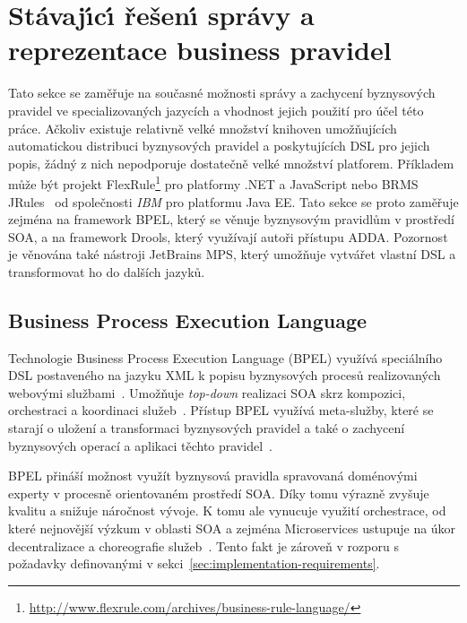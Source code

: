 \section{Stávaj\'{\i}c\'{\i} řešen\'{\i} správy a reprezentace business pravidel}\label{sec:business-rule-dsl}

Tato sekce se zaměřuje na současné možnosti správy a zachycení byznysových pravidel
ve specializovaných jazycích a vhodnost jejich použití pro účel této práce.
Ačkoliv existuje relativně velké množství knihoven umožňujících automatickou distribuci
byznysových pravidel a poskytujících \gls{DSL} pro jejich popis, žádný z nich nepodporuje dostatečně velké množství platforem.
Příkladem může být projekt FlexRule\footnote{\url{http://www.flexrule.com/archives/business-rule-language/}} pro platformy .NET a
JavaScript nebo \gls{BRMS} JRules~\cite{boyer2011ibm} od společnosti \textit{IBM} pro platformu \gls{Java EE}.
Tato sekce se proto zaměřuje zejména na framework \gls{BPEL}, který se věnuje byznysovým pravidlům v prostředí \gls{SOA}, a na
framework Drools, který využívají autoři přístupu \gls{ADDA}. Pozornost je věnována také nástroji JetBrains MPS,
který umožňuje vytvářet vlastní \gls{DSL} a transformovat ho do dalších jazyků.

\subsection{Business Process Execution Language}

Technologie Business Process Execution Language (\gls{BPEL}) využívá speciálního \gls{DSL}
postaveného na jazyku \gls{XML} k popisu byznysových procesů realizovaných webovými
službami~\cite{andrews2003business}. Umožňuje \textit{top-down} realizaci \gls{SOA}
skrz kompozici, orchestraci a koordinaci služeb~\cite{oraclebpel}.
Přístup \gls{BPEL} využívá meta-služby, které se starají o uložení a transformaci byznysových pravidel
a také o zachycení byznysových operací a aplikaci těchto pravidel~\cite{rosenberg2005business}.

\gls{BPEL} přináší možnost využít byznysová pravidla spravovaná doménovými experty
v procesně orientovaném prostředí \gls{SOA}. Díky tomu výrazně zvyšuje kvalitu a snižuje
náročnost vývoje. K tomu ale vynucuje využití orchestrace, od které nejnovější výzkum v oblasti \gls{SOA}
a zejména Microservices ustupuje na úkor decentralizace a choreografie
služeb~\cite{bakshi2017microservices, cerny2018contextual}. Tento fakt je zároveň
v rozporu s požadavky definovanými v sekci~\ref{sec:implementation-requirements}.

